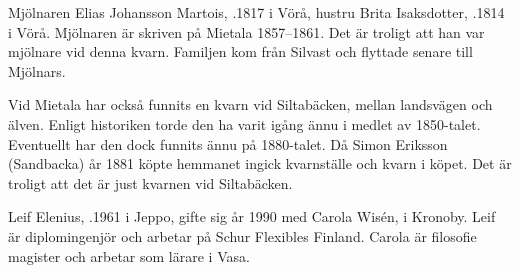 Mjölnaren Elias Johansson Martois, .1817 i Vörå, hustru Brita Isaksdotter, .1814 i Vörå. Mjölnaren är skriven på Mietala 1857–1861. Det är troligt att han var mjölnare vid denna kvarn. Familjen kom från Silvast och flyttade senare till Mjölnars.
\begin{jhchildren}
  \item {}
  \item {}
  \item {}
  \item {}
  \item {}
  \item {}
  \item {}
  \item {}
\end{jhchildren}


Vid Mietala har också funnits en kvarn vid Siltabäcken, mellan landsvägen och älven. Enligt historiken torde den ha varit igång ännu i medlet av 1850-talet. Eventuellt har den dock funnits ännu på 1880-talet. Då Simon Eriksson (Sandbacka) år 1881 köpte hemmanet ingick kvarnställe och kvarn  i köpet. Det är troligt att det är just kvarnen vid Siltabäcken.






Leif Elenius, .1961 i Jeppo, gifte sig år 1990 med Carola Wisén,  i Kronoby. Leif är diplomingenjör och arbetar på Schur Flexibles Finland. Carola är filosofie magister och arbetar som lärare i Vasa.

\begin{jhchildren}
  \item {}
  \item {}
  \item {}
\end{jhchildren}

